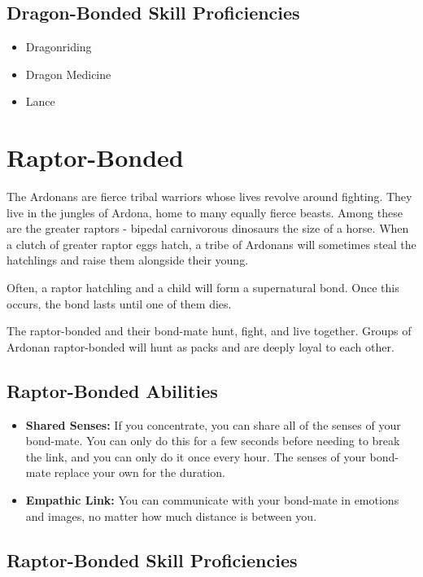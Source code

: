 \begin{multicols}{2}
\subsection{Dragon-Bonded Skill Proficiencies}

\begin{itemize}
  \item Dragonriding
  \item Dragon Medicine
  \item Lance
\end{itemize}

\section{Raptor-Bonded}

The Ardonans are fierce tribal warriors whose lives revolve around
fighting. They live in the jungles of Ardona, home to many equally
fierce beasts. Among these are the greater raptors - bipedal carnivorous
dinosaurs the size of a horse. When a clutch of greater raptor eggs hatch,
a tribe of Ardonans will sometimes steal the hatchlings and raise them
alongside their young.

Often, a raptor hatchling and a child will form a supernatural bond.
Once this occurs, the bond lasts until one of them dies.

The raptor-bonded and their bond-mate hunt, fight, and live together.
Groups of Ardonan raptor-bonded will hunt as packs and are deeply loyal
to each other.

\subsection{Raptor-Bonded Abilities}

\begin{itemize}
  \item \textbf{Shared Senses:} If you concentrate, you can share all
    of the senses of your bond-mate. You can only do this for a few seconds
    before needing to break the link, and you can only do it once every hour.
    The senses of your bond-mate replace your own for the duration.
  \item \textbf{Empathic Link:} You can communicate with your bond-mate
    in emotions and images, no matter how much distance is between you.
\end{itemize}

\subsection{Raptor-Bonded Skill Proficiencies}


\end{multicols}
